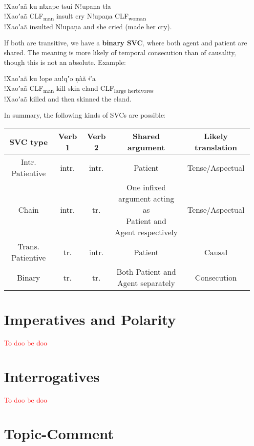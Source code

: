 \documentclass[11pt]{book}
\newcommand{\grammsc}[1]{\textsc{#1}}
\newcommand{\CLF}[1]{\grammsc{CLF}\textsubscript{#1}}
\newcommand{\cmnt}[1]{\textcolor{red}{#1}}
\begin{document}
\begin{exe}
\ex
\gll ǃXaoʼaã ku nǁxape tsui Nǃupaṇa  tła\\
ǃXaoʼaã \CLF{man} insult cry Nǃupaṇa \CLF{woman}\\
\glt ǃXaoʼaã insulted Nǃupaṇa and she cried (made her cry).
\end{exe}

If both are transitive, we have a \textbf{binary SVC}, where both agent and patient are shared. The meaning is more likely of temporal consecution than of causality, though this is not an absolute. Example:

\begin{exe}
\ex
\gll ǃXaoʼaã ku ǃope auǃqʼo ṇàã ǂʼa\\
ǃXaoʼaã \CLF{man} kill skin eland \CLF{large herbivores}\\
\glt ǃXaoʼaã killed and then skinned the eland.
\end{exe}

In summary, the following kinds of SVCs are possible:

\begin{tabular}{|c|c|c|c|c|}
\hline
\textbf{SVC type} & \textbf{Verb 1} & \textbf{Verb 2} & \textbf{Shared argument} & \textbf{Likely translation}\\\hline \hline
Intr. Patientive & intr. & intr. & Patient & Tense/Aspectual \\ \hline
Chain & intr. & tr. &\makecell{One infixed argument acting as\\ Patient and Agent respectively} & Tense/Aspectual \\\hline
Trans. Patientive & tr. & intr. & Patient & Causal \\\hline
Binary & tr. & tr. & Both Patient and Agent separately & Consecution \\  \hline
\end{tabular}

\section{Imperatives and Polarity}

\cmnt{To doo be doo}

\section{Interrogatives}

\cmnt{To doo be doo}

\section{Topic-Comment}\label{sec:topiccomment}
\end{document}

